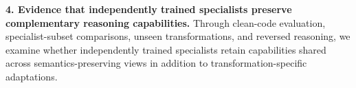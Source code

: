 \textbf{4. Evidence that independently trained specialists preserve
complementary reasoning capabilities.}
Through clean-code evaluation, specialist-subset comparisons, unseen
transformations, and reversed reasoning, we examine whether independently
trained specialists retain capabilities shared across semantics-preserving
views in addition to transformation-specific adaptations.